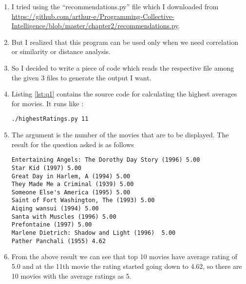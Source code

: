 \begin{enumerate}
\item I tried using the ``recommendations.py'' file which I downloaded from \url{https://github.com/arthur-e/Programming-Collective-Intelligence/blob/master/chapter2/recommendations.py}.
\item But I realized that this program can be used only when we need correlation or similarity or distance analysis. 
\item So I decided to write a piece of code which reads the respective file among the given 3 files to generate the output I want. 
\item Listing \ref{lst:q1} contains the source code for calculating the highest averages for movies. It runs like : 
\begin{lstlisting}[frame=single]
./highestRatings.py 11 
\end{lstlisting}
\item The argument is the number of the movies that are to be displayed. The result for the question asked is as follows 

\begin{lstlisting}[frame=single]
Entertaining Angels: The Dorothy Day Story (1996) 5.00
Star Kid (1997) 5.00
Great Day in Harlem, A (1994) 5.00
They Made Me a Criminal (1939) 5.00
Someone Else's America (1995) 5.00
Saint of Fort Washington, The (1993) 5.00
Aiqing wansui (1994) 5.00
Santa with Muscles (1996) 5.00
Prefontaine (1997) 5.00
Marlene Dietrich: Shadow and Light (1996)  5.00
Pather Panchali (1955) 4.62
\end{lstlisting}

\item From the above result we can see that top 10 movies have average rating of 5.0 and at the 11th movie the rating started going down to 4.62, so there are 10 movies with the average ratings as 5.
  
\end{enumerate}
\newpage

\newpage